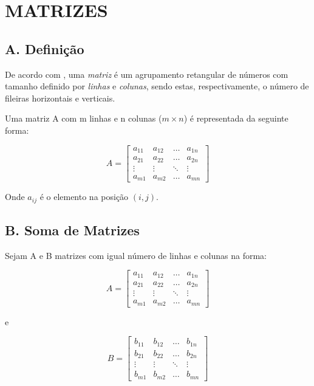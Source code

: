 \documentclass[twocolumn, 10pt]{extarticle}
\begin{document}
\section{MATRIZES}
\subsection*{A. \quad Definição}

De acordo com \cite[p. 26]{antonAlgebra}, uma \textit{matriz} é um agrupamento retangular de números com tamanho definido por \textit{linhas} e \textit{colunas}, sendo estas, respectivamente, o número de fileiras horizontais e verticais.

Uma matriz A com m linhas e n colunas ($m \times n$) é representada da seguinte forma:

\[ 
A = 
\begin{bmatrix}
a_{11} & a_{12} & \dots & a_{1n} \\
a_{21} & a_{22} & \dots & a_{2n} \\
\vdots & \vdots & \ddots & \vdots \\
a_{m1} & a_{m2} & \dots & a_{mn} 

\end{bmatrix}
\]

Onde $a_{ij}$ é o elemento na posição $(i, j)$.


\subsection*{B. \quad Soma de Matrizes}

Sejam A e B matrizes com igual número de linhas e colunas na forma:

\[ 
A = 
\begin{bmatrix}
a_{11} & a_{12} & \dots & a_{1n} \\
a_{21} & a_{22} & \dots & a_{2n} \\
\vdots & \vdots & \ddots & \vdots \\
a_{m1} & a_{m2} & \dots & a_{mn} 

\end{bmatrix}
\]

e

\[ 
B = 
\begin{bmatrix}
b_{11} & b_{12} & \dots & b_{1n} \\
b_{21} & b_{22} & \dots & b_{2n} \\
\vdots & \vdots & \ddots & \vdots \\
b_{m1} & b_{m2} & \dots & b_{mn} 

\end{bmatrix}
\]
\end{document}
